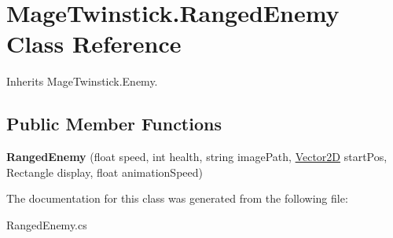 \hypertarget{class_mage_twinstick_1_1_ranged_enemy}{}\section{Mage\+Twinstick.\+Ranged\+Enemy Class Reference}
\label{class_mage_twinstick_1_1_ranged_enemy}


Inherits Mage\+Twinstick.\+Enemy.

\subsection*{Public Member Functions}
\begin{DoxyCompactItemize}
\item 
\hypertarget{class_mage_twinstick_1_1_ranged_enemy_ac9144b929ee221ab7ed7e0e497edfef8}{}{\bfseries Ranged\+Enemy} (float speed, int health, string image\+Path, \hyperlink{class_mage_twinstick_1_1_vector2_d}{Vector2\+D} start\+Pos, Rectangle display, float animation\+Speed)\label{class_mage_twinstick_1_1_ranged_enemy_ac9144b929ee221ab7ed7e0e497edfef8}

\end{DoxyCompactItemize}


The documentation for this class was generated from the following file\+:\begin{DoxyCompactItemize}
\item 
Ranged\+Enemy.\+cs\end{DoxyCompactItemize}
